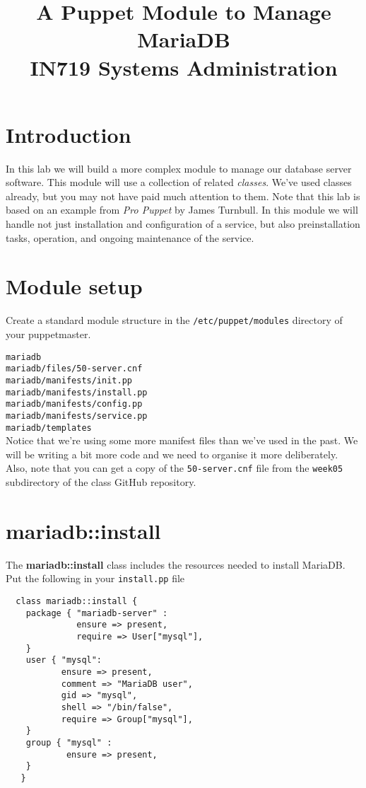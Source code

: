 \documentclass{article}   	%
\title{A Puppet Module to Manage MariaDB \\ IN719 Systems Administration}
\date{}							%
\begin{document}
\maketitle

\section*{Introduction}
In this lab we will build a more complex module to manage our database server software.  This module will use a collection of related \emph{classes}.  We've used classes already, but you may not have paid much attention to them.  Note that this lab is based on an example from \emph{Pro Puppet} by James Turnbull.  In this module we will handle not just installation and configuration of a service, but also preinstallation tasks, operation, and ongoing maintenance of the service.
\section{Module setup}
Create a standard module structure in the \texttt{/etc/puppet/modules} directory of your puppetmaster.

\texttt{mariadb} \\
\texttt{mariadb/files/50-server.cnf} \\
\texttt{mariadb/manifests/init.pp} \\
\texttt{mariadb/manifests/install.pp} \\
\texttt{mariadb/manifests/config.pp} \\
\texttt{mariadb/manifests/service.pp} \\
\texttt{mariadb/templates} \\

Notice that we're using some more manifest files than we've used in the past. We will be writing a bit more code and we need to organise it more deliberately. Also, note that you can get a copy of the \texttt{50-server.cnf} file from the \texttt{week05} subdirectory of the class GitHub repository.

\section{mariadb::install}
The \textbf{mariadb::install} class includes the resources needed to install MariaDB.  Put the following in your \texttt{install.pp} file

\begin{verbatim}
  class mariadb::install {
    package { "mariadb-server" :
              ensure => present,
              require => User["mysql"],
    }
    user { "mysql":
           ensure => present,
           comment => "MariaDB user",
           gid => "mysql",
           shell => "/bin/false",
           require => Group["mysql"],
    }
    group { "mysql" :
            ensure => present,
    }
   }

\end{verbatim}
\end{document}
